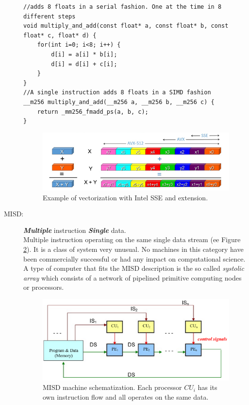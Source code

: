 \begin{description}
{	%
}
\begin{lstlisting}
//adds 8 floats in a serial fashion. One at the time in 8 different steps
void multiply_and_add(const float* a, const float* b, const float* c, float* d) {  
	for(int i=0; i<8; i++) {
		d[i] = a[i] * b[i];
		d[i] = d[i] + c[i];
	}
}
//A single instruction adds 8 floats in a SIMD fashion
__m256 multiply_and_add(__m256 a, __m256 b, __m256 c) {
	return _mm256_fmadd_ps(a, b, c);
}
\end{lstlisting}
\begin{figure}[!htbp]
	\centering
	\includegraphics[width=1.0\textwidth]{./images/parallel_programming/vectorization_example}
	\caption{Example of vectorization with Intel SSE and extension.}
	\label{fig:SSEvectorization}
\end{figure}

\item[MISD:] \textit{\textbf{Multiple}} instruction \textit{\textbf{Single}} data. \hfill \\ 
Multiple instruction operating on the same single data stream  (ee Figure \ref{fig:MISD}). It is a class of system very unusual. No machines in this category have been commercially successful or had any impact on computational science. 
A type of computer  that fits the MISD description is the so called \textit{systolic array} \cite{fortes:1987,kung:1984} which consists of a network of pipelined primitive computing nodes or processors. 
\begin{figure}[!htbp]
	\centering
	\includegraphics[width=1.0\textwidth]{./images/parallel_programming/MISD}
	\caption{MISD machine schematization. Each processor $CU_i$ has its own instruction flow and all operates on the same data.}
	\label{fig:MISD}
\end{figure}
 

\end{description}
